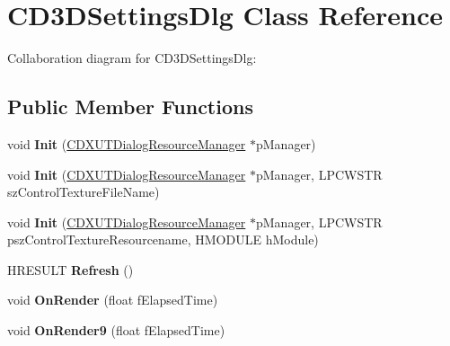 \hypertarget{class_c_d3_d_settings_dlg}{\section{C\+D3\+D\+Settings\+Dlg Class Reference}
\label{class_c_d3_d_settings_dlg}
}


Collaboration diagram for C\+D3\+D\+Settings\+Dlg\+:
\subsection*{Public Member Functions}
\begin{DoxyCompactItemize}
\item 
\hypertarget{class_c_d3_d_settings_dlg_ad729e65b02d7da4db7672d29d0d7c935}{void {\bfseries Init} (\hyperlink{class_c_d_x_u_t_dialog_resource_manager}{C\+D\+X\+U\+T\+Dialog\+Resource\+Manager} $\ast$p\+Manager)}\label{class_c_d3_d_settings_dlg_ad729e65b02d7da4db7672d29d0d7c935}

\item 
\hypertarget{class_c_d3_d_settings_dlg_a3a9d268771e11c24188ad4be4185ede3}{void {\bfseries Init} (\hyperlink{class_c_d_x_u_t_dialog_resource_manager}{C\+D\+X\+U\+T\+Dialog\+Resource\+Manager} $\ast$p\+Manager, L\+P\+C\+W\+S\+T\+R sz\+Control\+Texture\+File\+Name)}\label{class_c_d3_d_settings_dlg_a3a9d268771e11c24188ad4be4185ede3}

\item 
\hypertarget{class_c_d3_d_settings_dlg_acbf3721135cc7408a8aeb0cc0340d3a8}{void {\bfseries Init} (\hyperlink{class_c_d_x_u_t_dialog_resource_manager}{C\+D\+X\+U\+T\+Dialog\+Resource\+Manager} $\ast$p\+Manager, L\+P\+C\+W\+S\+T\+R psz\+Control\+Texture\+Resourcename, H\+M\+O\+D\+U\+L\+E h\+Module)}\label{class_c_d3_d_settings_dlg_acbf3721135cc7408a8aeb0cc0340d3a8}

\item 
\hypertarget{class_c_d3_d_settings_dlg_ae7602b7c1fc461fdc997c40de550ccbe}{H\+R\+E\+S\+U\+L\+T {\bfseries Refresh} ()}\label{class_c_d3_d_settings_dlg_ae7602b7c1fc461fdc997c40de550ccbe}

\item 
\hypertarget{class_c_d3_d_settings_dlg_a0864a3219e8cda6e3a2700596c85b76b}{void {\bfseries On\+Render} (float f\+Elapsed\+Time)}\label{class_c_d3_d_settings_dlg_a0864a3219e8cda6e3a2700596c85b76b}

\item 
\hypertarget{class_c_d3_d_settings_dlg_afd5e59e8f288ae55bf95ef211a6ca06b}{void {\bfseries On\+Render9} (float f\+Elapsed\+Time)}\label{class_c_d3_d_settings_dlg_afd5e59e8f288ae55bf95ef211a6ca06b}


\end{DoxyCompactItemize}

